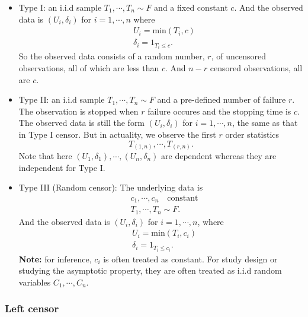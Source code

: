 \documentclass[a4paper,12pt]{article}
\begin{document}
\begin{itemize}
\item Type I: an i.i.d sample $T_1, \cdots, T_n \sim F$ and a {\color{red} fixed} constant $c$. And the observed data is $\left(U_i, \delta_i\right)$ for $i = 1, \cdots, n$ where
  \[
    \begin{aligned}
      & U_i = \mathrm{min}\left(T_i, c\right)    \\
      & \delta_i = 1_{T_i \leq c}
      .
    \end{aligned}
  \]
  So the observed data consists of a {\color{red} random} number, $r$, of uncensored observations, all of which are less than $c$. And $n - r$ censored observations, all are $c$.
  
\item Type II: an i.i.d sample $T_1, \cdots, T_n \sim F$ and a {\color{red} pre-defined} number of failure $r$. The observation is stopped when $r$ failure occures and the stopping time is $c$. The observed data is still the form $\left(U_i, \delta_i\right)$ for $i = 1, \cdots, n$, the same as that in Type I censor. But in actuality, we observe the first $r$ {\color{red} order statistics}
  \[
    T_{\left(1, n\right)}, \cdots, T_{\left(r, n\right)}
    .
  \]
  Note that here $\left(U_1, \delta_1\right), \cdots, \left(U_n, \delta_n\right)$ are {\color{red} dependent} whereas they are independent for Type I.
  
\item Type III (Random censor): The underlying data is
  \[
    \begin{aligned}
      & c_1, \cdots, c_n \quad \text{constant}    \\
      & T_1, \cdots, T_n \sim F
      .
    \end{aligned}
  \]
  And the observed data is $\left(U_i, \delta_i\right)$ for $i = 1, \cdots, n$, where
  \[
    \begin{aligned}
      & U_i = \mathrm{min}\left(T_i, c_i\right)    \\
      & \delta_i = 1_{T_i \leq c_i}
      .
    \end{aligned}
  \]
  \textbf{Note: } for inference, $c_i$ is often treated as constant. For study design or studying the asymptotic property, they are often treated as i.i.d random variables $C_1, \cdots, C_n$.
\end{itemize}

\subsubsection{Left censor}
\label{sec:left-censor}
\end{document}
